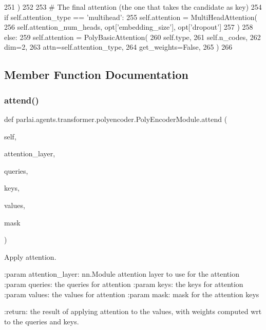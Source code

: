 \begin{DoxyCode}
251                 )
252 
253         \textcolor{comment}{# The final attention (the one that takes the candidate as key)}
254         \textcolor{keywordflow}{if} self.attention\_type == \textcolor{stringliteral}{'multihead'}:
255             self.attention = MultiHeadAttention(
256                 self.attention\_num\_heads, opt[\textcolor{stringliteral}{'embedding\_size'}], opt[\textcolor{stringliteral}{'dropout'}]
257             )
258         \textcolor{keywordflow}{else}:
259             self.attention = PolyBasicAttention(
260                 self.type,
261                 self.n\_codes,
262                 dim=2,
263                 attn=self.attention\_type,
264                 get\_weights=\textcolor{keyword}{False},
265             )
266 
\end{DoxyCode}


\subsection{Member Function Documentation}
\mbox{\label{classparlai_1_1agents_1_1transformer_1_1polyencoder_1_1PolyEncoderModule_a21343cb181ee148326166a8e32e9e3d6}} 
\subsubsection{\texorpdfstring{attend()}{attend()}}
{\footnotesize\ttfamily def parlai.\+agents.\+transformer.\+polyencoder.\+Poly\+Encoder\+Module.\+attend (\begin{DoxyParamCaption}\item[{}]{self,  }\item[{}]{attention\+\_\+layer,  }\item[{}]{queries,  }\item[{}]{keys,  }\item[{}]{values,  }\item[{}]{mask }\end{DoxyParamCaption})}

\begin{DoxyVerb}Apply attention.

:param attention_layer:
    nn.Module attention layer to use for the attention
:param queries:
    the queries for attention
:param keys:
    the keys for attention
:param values:
    the values for attention
:param mask:
    mask for the attention keys

:return:
    the result of applying attention to the values, with weights computed
    wrt to the queries and keys.
\end{DoxyVerb}
 

